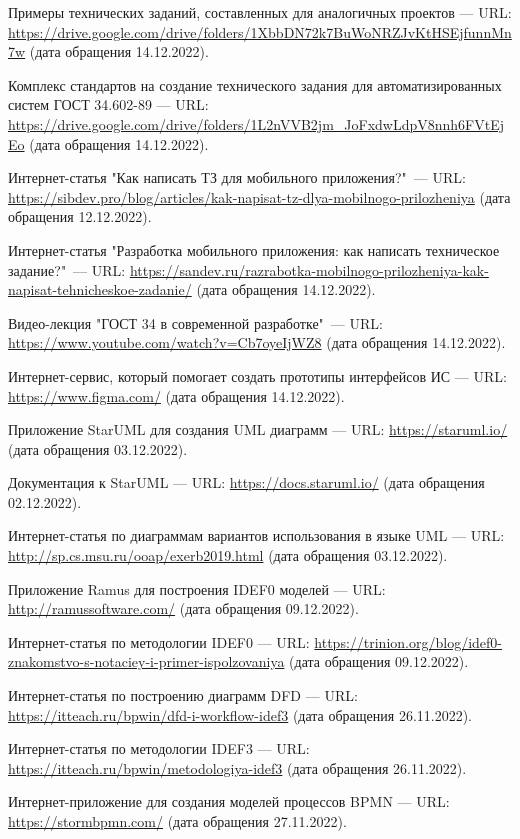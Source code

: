 \documentclass[14pt]{extreport}
\begin{document}
\newpage
\begin{thebibliography}{99}

Примеры технических заданий, составленных для аналогичных проектов — URL: \url{https://drive.google.com/drive/folders/1XbbDN72k7BuWoNRZJvKtHSEjfunnMn7w} (дата обращения 14.12.2022).

Комплекс стандартов на создание технического задания для автоматизированных систем ГОСТ 34.602-89 — URL: \url{https://drive.google.com/drive/folders/1L2nVVB2jm_JoFxdwLdpV8nnh6FVtEjEo} (дата обращения 14.12.2022).

Интернет-статья "Как написать ТЗ для мобильного приложения?"\ — URL: \url{https://sibdev.pro/blog/articles/kak-napisat-tz-dlya-mobilnogo-prilozheniya} (дата обращения 12.12.2022).

Интернет-статья "Разработка мобильного приложения: как написать техническое задание?"\ — URL: \url{https://sandev.ru/razrabotka-mobilnogo-prilozheniya-kak-napisat-tehnicheskoe-zadanie/} (дата обращения 14.12.2022).

Видео-лекция "ГОСТ 34 в современной разработке"\  — URL: \url{https://www.youtube.com/watch?v=Cb7oyeIjWZ8} (дата обращения 14.12.2022).

Интернет-сервис, который помогает создать прототипы интерфейсов ИС — URL: \url{https://www.figma.com/} (дата обращения 14.12.2022).	

Приложение StarUML для создания UML диаграмм — URL: \url{https://staruml.io/} (дата обращения 03.12.2022).	

Документация к StarUML — URL: \url{https://docs.staruml.io/} (дата обращения 02.12.2022).	

Интернет-статья по диаграммам вариантов использования в языке UML — URL: \url{http://sp.cs.msu.ru/ooap/exerb2019.html} (дата обращения 03.12.2022).	

Приложение Ramus для построения IDEF0 моделей — URL: \url{http://ramussoftware.com/} (дата обращения 09.12.2022).	

Интернет-статья по методологии IDEF0 — URL: \url{https://trinion.org/blog/idef0-znakomstvo-s-notaciey-i-primer-ispolzovaniya} (дата обращения 09.12.2022).	

Интернет-статья по построению диаграмм DFD — URL: \url{https://itteach.ru/bpwin/dfd-i-workflow-idef3} (дата обращения 26.11.2022).	

Интернет-статья по методологии IDEF3 — URL: \url{https://itteach.ru/bpwin/metodologiya-idef3} (дата обращения 26.11.2022).	

Интернет-приложение для создания моделей процессов BPMN — URL: \url{https://stormbpmn.com/} (дата обращения 27.11.2022).	
	
	
\end{thebibliography}
\end{document}
